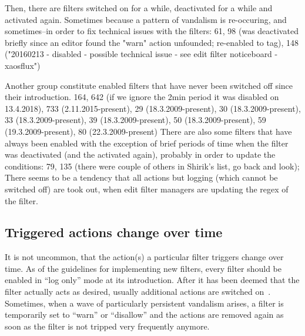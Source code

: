 Then, there are filters switched on for a while, deactivated for a while and activated again.
Sometimes because a pattern of vandalism is re-occuring, and sometimes–in order to fix technical issues with the filters: 61, 98 (was deactivated briefly since an editor found the "warn" action unfounded; re-enabled to tag), 148 ("20160213 - disabled - possible technical issue - see edit filter noticeboard - xaosflux")

Another group constitute enabled filters that have never been switched off since their introduction.
  164, 642 (if we ignore the 2min period it was disabled on 13.4.2018), 733 (2.11.2015-present), 29 (18.3.2009-present), 30 (18.3.2009-present), 33 (18.3.2009-present), 39 (18.3.2009-present), 50 (18.3.2009-present), 59 (19.3.2009-present), 80 (22.3.2009-present)
There are also some filters that have always been enabled with the exception of brief periods of time when the filter was deactivated (and the activated again), probably in order to update the conditions: 79, 135 (there were couple of others in Shirik's list, go back and look);
There seems to be a tendency that all actions but logging (which cannot be switched off) are took out, when edit filter managers are updating the regex of the filter.

\subsection{Triggered actions change over time}
It is not uncommon, that the action(s) a particular filter triggers change over time.
As of the guidelines for implementing new filters, every filter should be enabled in ``log only'' mode at its introduction.
After it has been deemed that the filter actually acts as desired, usually additional actions are switched on~\cite{Wikipedia:EditFilterInstructions}.
Sometimes, when a wave of particularly persistent vandalism arises, a filter is temporarily set to ``warn'' or ``disallow'' and the actions are removed again as soon as the filter is not tripped very frequently anymore. %

